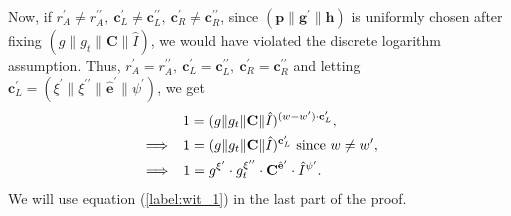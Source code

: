   Now, if $r_A^{\prime} \neq r_A^{\prime \prime}, \ \textbf{c}_{L}^{\prime} \neq \textbf{c}_{L}^{\prime \prime}, \ \textbf{c}_{R}^{\prime} \neq \textbf{c}_{R}^{\prime \prime}$, since $(\textbf{p}\| \textbf{g}^{\prime} \| \textbf{h})$ is uniformly chosen after fixing $(g \| g_t \| \textbf{C} \| \hat{I})$, 
  we would have violated the discrete logarithm assumption. Thus, $r_A^{\prime} = r_A^{\prime \prime}, \ \textbf{c}_{L}^{\prime} = \textbf{c}_{L}^{\prime \prime}, \ \textbf{c}_{R}^{\prime} = \textbf{c}_{R}^{\prime \prime}$ and letting $\textbf{c}_L^{\prime} = (\xi^{\prime} \| \xi^{\prime \prime} \| \hat{\textbf{e}}^{\prime} \| \psi^{\prime})$,
  we get 
  \begin{gather}
    1 = (g \| g_t \| \textbf{C} \| \hat{I})^{(w-w^{\prime}) \cdot \textbf{c}_L^{\prime}}, \nonumber \\
    \implies \hspace{1.8mm} 1 = (g \| g_t \| \textbf{C} \| \hat{I})^{\textbf{c}_L^{\prime}} \text{  since } w \neq w^{\prime}, \nonumber \\
    \hspace{-14.1mm} \implies \hspace{1.8mm} 1 = g^{\xi^{\prime}} \cdot g_t^{\xi^{\prime \prime}} \cdot \textbf{C}^{\hat{\textbf{e}}^{\prime}} \cdot \hat{I}^{\psi^{\prime}}. \label{label:wit_1}
  \end{gather}
  We will use equation (\ref{label:wit_1}) in the last part of the proof.\\
  
